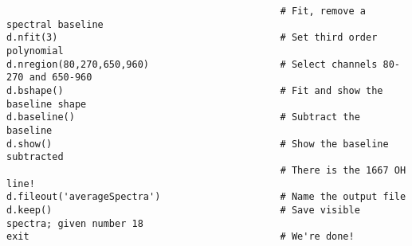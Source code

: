 
\begin{verbatim}
                                                # Fit, remove a spectral baseline
d.nfit(3)                                       # Set third order polynomial
d.nregion(80,270,650,960)                       # Select channels 80-270 and 650-960 
d.bshape()                                      # Fit and show the baseline shape 
d.baseline()                                    # Subtract the baseline 
d.show()                                        # Show the baseline subtracted 
                                                # There is the 1667 OH line!
d.fileout('averageSpectra')                     # Name the output file 
d.keep()                                        # Save visible spectra; given number 18
exit                                            # We're done!
\end{verbatim}

